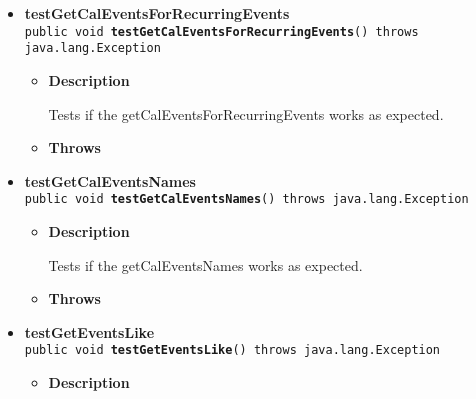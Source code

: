 \documentclass[11pt,a4paper]{report}
\begin{document}
{{{\begin{itemize}
{\begin{itemize}
{Tries to add an event to the database and then extract it back from the database and compare it with the original.
}
\item{{\bf  Throws}
}%
\end{itemize}
}%
\item{ 
{\bf  testGetCalEventsForRecurringEvents}\\
\texttt{public void\ {\bf  testGetCalEventsForRecurringEvents}() throws java.lang.Exception
\label{is.mpg.ruglan.test.DabbiTest.testGetCalEventsForRecurringEvents()}}%
\begin{itemize}
\item{
{\bf  Description}

Tests if the getCalEventsForRecurringEvents works as expected.
}
\item{{\bf  Throws}
}%
\end{itemize}
}%
\item{ 
{\bf  testGetCalEventsNames}\\
\texttt{public void\ {\bf  testGetCalEventsNames}() throws java.lang.Exception
\label{is.mpg.ruglan.test.DabbiTest.testGetCalEventsNames()}}%
\begin{itemize}
\item{
{\bf  Description}

Tests if the getCalEventsNames works as expected.
}
\item{{\bf  Throws}
}%
\end{itemize}
}%
\item{ 
{\bf  testGetEventsLike}\\
\texttt{public void\ {\bf  testGetEventsLike}() throws java.lang.Exception
\label{is.mpg.ruglan.test.DabbiTest.testGetEventsLike()}}%
\begin{itemize}
\item{
{\bf  Description}

}
\end{itemize}}
\end{itemize}}}}
\end{document}
